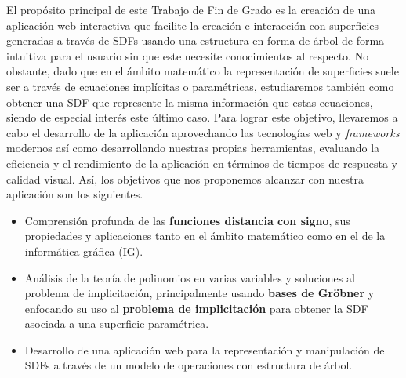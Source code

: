 El propósito principal de este Trabajo de Fin de Grado es la creación de una aplicación web interactiva que facilite la creación e interacción con superficies generadas a través de SDFs usando una estructura en forma de árbol de forma intuitiva para el usuario sin que este necesite conocimientos al respecto. No obstante, dado que en el ámbito matemático la representación de superficies suele ser a través de ecuaciones implícitas o paramétricas, estudiaremos también como obtener una SDF que represente la misma información que estas ecuaciones, siendo de especial interés este último caso. Para lograr este objetivo, llevaremos a cabo el desarrollo de la aplicación aprovechando las tecnologías web y \textit{frameworks} modernos así como desarrollando nuestras propias herramientas, evaluando la eficiencia y el rendimiento de la aplicación en términos de tiempos de respuesta y calidad visual. Así, los objetivos que nos proponemos alcanzar con nuestra aplicación son los siguientes.
\begin{itemize}
    \item Comprensión profunda de las \textbf{funciones distancia con signo}, sus propiedades y aplicaciones tanto en el ámbito matemático como en el de la informática gráfica (IG).
    \item Análisis de la teoría de polinomios en varias variables y soluciones al problema de implicitación, principalmente usando \textbf{bases de Gröbner} y enfocando su uso al \textbf{problema de implicitación} para obtener la SDF asociada a una superficie paramétrica.
    \item Desarrollo de una aplicación web para la representación y manipulación de SDFs a través de un modelo de operaciones con estructura de árbol.
\end{itemize}

